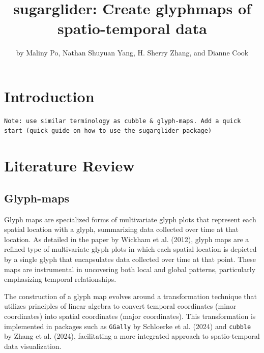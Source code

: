 \title{sugarglider: Create glyphmaps of spatio-temporal data}


\author{by Maliny Po, Nathan Shuyuan Yang, H. Sherry Zhang, and Dianne Cook}

\maketitle


\section{Introduction}\label{introduction}

\begin{verbatim}
Note: use similar terminology as cubble & glyph-maps. Add a quick start (quick guide on how to use the sugarglider package)
\end{verbatim}

\section{Literature Review}\label{literature-review}

\subsection{Glyph-maps}\label{glyph-maps}

Glyph maps are specialized forms of multivariate glyph plots that represent each spatial location with a glyph, summarizing data collected over time at that location. As detailed in the paper by Wickham et al. (2012), glyph maps are a refined type of multivariate glyph plots in which each spatial location is depicted by a single glyph that encapsulates data collected over time at that point. These maps are instrumental in uncovering both local and global patterns, particularly emphasizing temporal relationships.

The construction of a glyph map evolves around a transformation technique that utilizes principles of linear algebra to convert temporal coordinates (minor coordinates) into spatial coordinates (major coordinates). This transformation is implemented in packages such as \texttt{GGally} by Schloerke et al. (2024) and \texttt{cubble} by Zhang et al. (2024), facilitating a more integrated approach to spatio-temporal data visualization.

